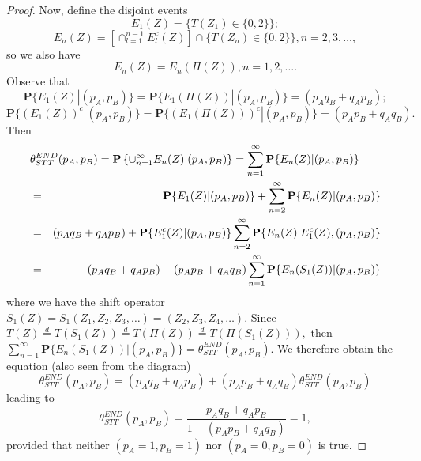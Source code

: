\documentclass[11pt]{article}
\theoremstyle{plain}
\theoremstyle{definition}
\renewcommand{\Pr}{\mathbf{P}}
\newcommand{\OLDPROOF}[1]{}
\begin{document}
\begin{proof}
Now, define the disjoint events
%
$$E_1(Z) = \{T(Z_1) \in \{0,2\}\};$$ 
$$E_n(Z) = \left[\cap_{l=1}^{n-1} E_l^c(Z)\right] \cap \{T(Z_n) \in \{0,2\}\}, n=2,3,\ldots,$$
%
so we also have
%
$$E_n(Z) = E_n(\Pi(Z)), n=1,2, \ldots.$$
%
Observe that
%
$$\Pr\{E_1(Z)|(p_A,p_B)\} = \Pr\{E_1(\Pi(Z))|(p_A,p_B)\} = (p_Aq_B + q_Ap_B);$$
$$\Pr\{(E_1(Z))^c|(p_A,p_B)\} = \Pr\{(E_1(\Pi(Z)))^c|(p_A,p_B)\} = (p_Ap_B + q_Aq_B).$$
%
Then
%
\begin{eqnarray*}
 \lefteqn{   \theta_{STT}^{END}(p_A,p_B)  =  \Pr\left\{ \cup_{n=1}^\infty E_n(Z) |(p_A,p_B)\right\} 
     =  \sum_{n=1}^\infty \Pr\{E_n(Z)|(p_A,p_B)\} } \\
    & = & \Pr\{E_1(Z)|(p_A,p_B)\} + \sum_{n=2}^\infty \Pr\{E_n(Z)|(p_A,p_B)\} \\
     & = & (p_Aq_B + q_Ap_B) + \Pr\{E_1^c(Z)|(p_A,p_B)\} %
     \sum_{n=2}^\infty \Pr\{E_n(Z)|E_1^c(Z),(p_A,p_B)\} \\
    & = & (p_Aq_B + q_Ap_B) + (p_Ap_B + q_Aq_B) 
    \sum_{n=1}^\infty \Pr\{E_n(S_1(Z))|(p_A,p_B)\} 
\end{eqnarray*}
%
where we have the shift operator
%
$S_1(Z) = S_1(Z_1,Z_2,Z_3,\ldots) = (Z_2,Z_3,Z_4,\ldots).$
%
Since
%
$T(Z) \stackrel{d}{=} T(S_1(Z)) \stackrel{d}{=} T(\Pi(Z)) \stackrel{d}{=} T(\Pi(S_1(Z))),$
%
then 
%
$\sum_{n=1}^\infty \Pr\{E_n(S_1(Z))|(p_A,p_B)\} = \theta_{STT}^{END}(p_A,p_B).$
%
We therefore obtain the equation (also seen from the diagram)
%
$$\theta_{STT}^{END}(p_A,p_B) = (p_Aq_B + q_Ap_B) + (p_Ap_B + q_Aq_B) \theta_{STT}^{END}(p_A,p_B)$$
%
leading to
%
$$\theta_{STT}^{END}(p_A,p_B) = \frac{p_Aq_B + q_Ap_B}{1 - (p_Ap_B + q_Aq_B)} = 1,$$
%
provided that neither $(p_A=1,p_B=1)$ nor $(p_A=0,p_B=0)$ is true.
%
\OLDPROOF{From this diagram, we obtain the equation
%
\begin{eqnarray*}
\lefteqn{ \theta_{STT}^{END}(p_A,p_B)  = } \\ 
&& p_Aq_B + q_Ap_B + \\ && p_Ap_Bq_Bp_A + p_Ap_Bp_Bq_A + q_Aq_Bq_Bp_A + q_Aq_Bp_Bq_A + \\
&& (p_Ap_Bq_Bq_A + p_Ap_Bp_Bp_A + q_Aq_Bq_Bq_A + q_Aq_Bp_Bp_A) \theta_{STT}^{END}(p_A,p_B) \\
& = & (p_Aq_B + p_Bq_A)(1 + p_Ap_B + q_Aq_B) + \\
&& (p_Ap_B +q_Aq_B)(q_Bq_A + p_Bp_A) \theta_{STT}^{END}(p_A,p_B).
\end{eqnarray*}
%
If neither $(p_A=p_B=0)$ nor $(p_A=p_B=1)$ is true, then $(p_Ap_B +q_Aq_B)(q_Bq_A + p_Bp_A) \ne 1$, so we could solve for $\theta_{STT}^{END}(p_A,p_B)$ which yields
}
\end{proof}
\end{document}
